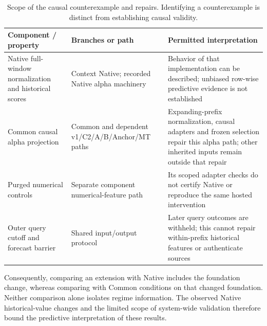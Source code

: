 \begin{table}[htbp]\centering\small{}
\caption[Scope of the causal counterexample and repairs]{Scope of the causal counterexample and repairs. Identifying a counterexample is distinct from establishing causal validity.}\label{tab:causal-scope}
\begin{tabular}{@{}P{.27\linewidth}P{.30\linewidth}P{.36\linewidth}@{}}\toprule
Component / property & Branches or path & Permitted interpretation\\\midrule
Native full-window normalization and historical scores & Context Native; recorded Native alpha machinery & Behavior of that implementation can be described; unbiased row-wise predictive evidence is not established\\
Common causal alpha projection & Common and dependent v1/C2/A/B/Anchor/MT paths & Expanding-prefix normalization, causal adapters and frozen selection repair this alpha path; other inherited inputs remain outside that repair\\
Purged numerical controls & Separate component numerical-feature path & Its scoped adapter checks do not certify Native or reproduce the same hosted intervention\\
Outer query cutoff and forecast barrier & Shared input/output protocol & Later query outcomes are withheld; this cannot repair within-prefix historical features or authenticate sources\\\bottomrule
\end{tabular}\end{table}

Consequently, comparing an extension with Native includes the foundation
change, whereas comparing with Common conditions on that changed
foundation. Neither comparison alone isolates regime information. The
observed Native historical-value changes and the limited scope of
system-wide validation therefore bound the predictive interpretation
of these results.

